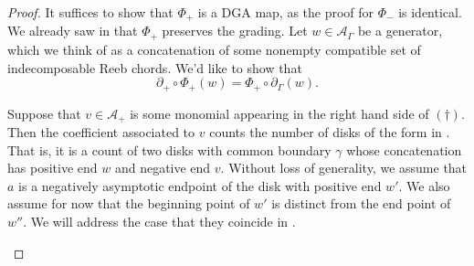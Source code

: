 \documentclass[10pt,a4paper]{amsart}
\begin{document}
\begin{proof}
    It suffices to show that $\Phi_+$ is a DGA map, as the proof for $\Phi_-$ is identical. We already saw in  that $\Phi_+$ preserves the grading. Let $w\in \mathcal{A}_\Gamma$ be a generator, which we think of as a concatenation of some nonempty compatible set of indecomposable Reeb chords. We'd like to show that 
    \[\partial_+\circ \Phi_+(w) = \Phi_+\circ \partial_\Gamma (w).\tag{\dag}\]

    Suppose that $v\in \mathcal{A}_+$ is some monomial appearing in the right hand side of $(\dag)$. Then the coefficient associated to $v$ counts the number of disks of the form in . That is, it is a count of two disks with common boundary $\gamma$ whose concatenation has positive end $w$ and negative end $v$. Without loss of generality, we assume that $a$ is a negatively asymptotic endpoint of the disk with positive end $w'$. We also assume for now that the beginning point of $w'$ is distinct from the end point of $w''$. We will address the case that they coincide in .

    \begin{figure}[h]
        \centering
\begin{tikzpicture}[x=0.65pt,y=0.65pt,yscale=-1,xscale=1]


\end{tikzpicture}
\end{figure}
\end{proof}
\end{document}
